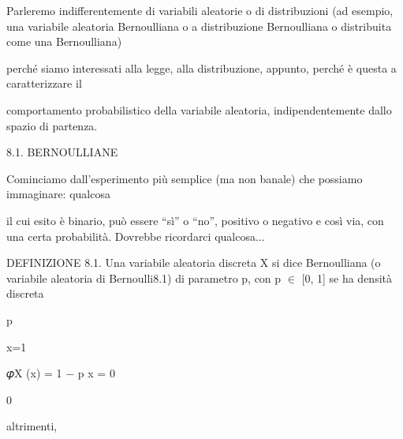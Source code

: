 \documentclass[a4paper,portrait,12pt]{article}
\begin{document}
\begin{flushleft}
Parleremo indifferentemente di variabili aleatorie o di distribuzioni (ad esempio, una variabile aleatoria Bernoulliana o a distribuzione Bernoulliana o distribuita come una Bernoulliana)
\end{flushleft}


\begin{flushleft}
perch\'{e} siamo interessati alla legge, alla distribuzione, appunto, perch\'{e} \`{e} questa a caratterizzare il
\end{flushleft}


\begin{flushleft}
comportamento probabilistico della variabile aleatoria, indipendentemente dallo spazio di partenza.
\end{flushleft}





\begin{flushleft}
8.1. BERNOULLIANE
\end{flushleft}


\begin{flushleft}
Cominciamo dall'esperimento più semplice (ma non banale) che possiamo immaginare: qualcosa
\end{flushleft}


\begin{flushleft}
il cui esito \`{e} binario, pu\`{o} essere {``}sì'' o {``}no'', positivo o negativo e così via, con una certa probabilit\`{a}. Dovrebbe ricordarci qualcosa...
\end{flushleft}


\begin{flushleft}
DEFINIZIONE 8.1. Una variabile aleatoria discreta X si dice Bernoulliana (o variabile aleatoria di Bernoulli8.1) di parametro p, con p $\in$ [0, 1] se ha densit\`{a} discreta
\end{flushleft}


\begin{flushleft}
p
\end{flushleft}


\begin{flushleft}
x=1
\end{flushleft}


\begin{flushleft}
𝜑X (x) = 1 $-$ p x = 0
\end{flushleft}


0


\begin{flushleft}
altrimenti,
\end{flushleft}
\end{document}
